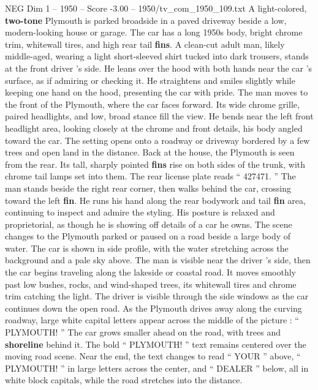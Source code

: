 \begin{textsample}{NEG Dim 1 – 1950 – Score -3.00 – 1950/tv\_com\_1950\_109.txt}  \label{ex:f1_neg_012}
A light-colored, \textbf{two-tone} Plymouth is parked broadside in a paved driveway beside a low, modern-looking house or garage.
The car has a long 1950s body, bright chrome trim, whitewall tires, and high rear tail \textbf{fins}.
A clean-cut adult man, likely middle-aged, wearing a light short-sleeved shirt tucked into dark trousers, stands at the front driver ’s side.
He leans over the hood with both hands near the car ’s surface, as if admiring or checking it.
He straightens and smiles slightly while keeping one hand on the hood, presenting the car with pride.
The man moves to the front of the Plymouth, where the car faces forward.
Its wide chrome grille, paired headlights, and low, broad stance fill the view.
He bends near the left front headlight area, looking closely at the chrome and front details, his body angled toward the car.
The setting opens onto a roadway or driveway bordered by a few trees and open land in the distance.
Back at the house, the Plymouth is seen from the rear.
Its tall, sharply pointed \textbf{fins} rise on both sides of the trunk, with chrome tail lamps set into them.
The rear license plate reads “ 427471. ” The man stands beside the right rear corner, then walks behind the car, crossing toward the left \textbf{fin}.
He runs his hand along the rear bodywork and tail \textbf{fin} area, continuing to inspect and admire the styling.
His posture is relaxed and proprietorial, as though he is showing off details of a car he owns.
The scene changes to the Plymouth parked or paused on a road beside a large body of water.
The car is shown in side profile, with the water stretching across the background and a pale sky above.
The man is visible near the driver ’s side, then the car begins traveling along the lakeside or coastal road.
It moves smoothly past low bushes, rocks, and wind-shaped trees, its whitewall tires and chrome trim catching the light.
The driver is visible through the side windows as the car continues down the open road.
As the Plymouth drives away along the curving roadway, large white capital letters appear across the middle of the picture : “ PLYMOUTH! ” The car grows smaller ahead on the road, with trees and \textbf{shoreline} behind it.
The bold “ PLYMOUTH! ” text remains centered over the moving road scene.
Near the end, the text changes to read “ YOUR ” above, “ PLYMOUTH! ” in large letters across the center, and “ DEALER ” below, all in white block capitals, while the road stretches into the distance.

\end{textsample}
